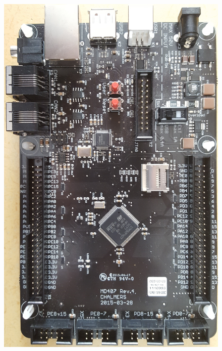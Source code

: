 \documentclass[a4paper]{article}
\begin{document}
\begin{figure}[H]
\includegraphics[scale=0.04]{MD407.jpg}

\end{figure}
\end{document}
